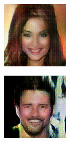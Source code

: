 \documentclass{article}
\begin{document}
\begin{center}
\begin{minipage}{0.24\linewidth}
\includegraphics[width=\textwidth]{samples_16_136.png}
\end{minipage}
\begin{minipage}{0.24\linewidth}
\includegraphics[width=\textwidth]{samples_16_224.png}

\end{minipage}
\end{center}
\end{document}
